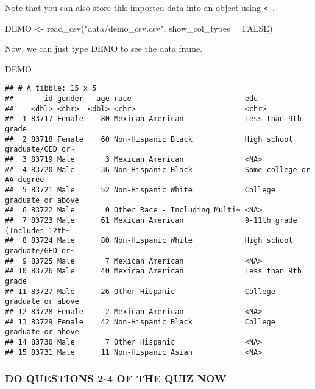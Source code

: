 \documentclass[
]{book}
\newenvironment{Shaded}{\begin{snugshade}}{\end{snugshade}}
\newcommand{\AttributeTok}[1]{\textcolor[rgb]{0.77,0.63,0.00}{#1}}
\newcommand{\ConstantTok}[1]{\textcolor[rgb]{0.00,0.00,0.00}{#1}}
\newcommand{\FunctionTok}[1]{\textcolor[rgb]{0.00,0.00,0.00}{#1}}
\newcommand{\NormalTok}[1]{#1}
\newcommand{\OtherTok}[1]{\textcolor[rgb]{0.56,0.35,0.01}{#1}}
\newcommand{\StringTok}[1]{\textcolor[rgb]{0.31,0.60,0.02}{#1}}
\begin{document}
Note that you can also store this imported data into an object using \texttt{\textless{}-}.

\begin{Shaded}
\begin{Highlighting}[]
\NormalTok{DEMO }\OtherTok{\textless{}{-}} \FunctionTok{read\_csv}\NormalTok{(}\StringTok{"data/demo\_csv.csv"}\NormalTok{, }\AttributeTok{show\_col\_types =} \ConstantTok{FALSE}\NormalTok{)}
\end{Highlighting}
\end{Shaded}

Now, we can just type DEMO to see the data frame.

\begin{Shaded}
\begin{Highlighting}[]
\NormalTok{DEMO}
\end{Highlighting}
\end{Shaded}

\begin{verbatim}
## # A tibble: 15 x 5
##       id gender   age race                          edu
##    <dbl> <chr>  <dbl> <chr>                         <chr>
##  1 83717 Female    80 Mexican American              Less than 9th grade
##  2 83718 Female    60 Non-Hispanic Black            High school graduate/GED or~
##  3 83719 Male       3 Mexican American              <NA>
##  4 83720 Male      36 Non-Hispanic Black            Some college or AA degree
##  5 83721 Male      52 Non-Hispanic White            College graduate or above
##  6 83722 Male       0 Other Race - Including Multi~ <NA>
##  7 83723 Male      61 Mexican American              9-11th grade (Includes 12th~
##  8 83724 Male      80 Non-Hispanic White            High school graduate/GED or~
##  9 83725 Male       7 Mexican American              <NA>
## 10 83726 Male      40 Mexican American              Less than 9th grade
## 11 83727 Male      26 Other Hispanic                College graduate or above
## 12 83728 Female     2 Mexican American              <NA>
## 13 83729 Female    42 Non-Hispanic Black            College graduate or above
## 14 83730 Male       7 Other Hispanic                <NA>
## 15 83731 Male      11 Non-Hispanic Asian            <NA>
\end{verbatim}

\hypertarget{do-questions-2-4-of-the-quiz-now}{%
\subsubsection{DO QUESTIONS 2-4 OF THE QUIZ NOW}\label{do-questions-2-4-of-the-quiz-now}}
\end{document}
